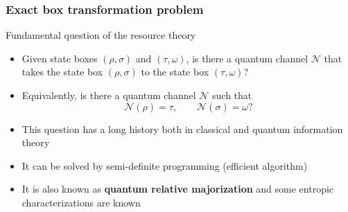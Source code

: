 \documentclass[usenames,dvipsnames,handout]{beamer}
\begin{document}
\begin{frame}

\frametitle{Exact box transformation problem}

\pause
\begin{block}{Fundamental question of the resource theory}

\begin{itemize}

\pause
\item Given state boxes $(\rho, \sigma)$ and  $(\tau, \omega)$, is there a quantum channel $\mathcal{N}$ that takes the state box $(\rho, \sigma)$ to the state box $(\tau, \omega)$?

\pause
\vspace{.1in}
\item Equivalently, is there a quantum channel $\mathcal{N}$ such that 
$$
\mathcal{N}(\rho) = \tau, \qquad \mathcal{N}(\sigma) = \omega   ?
$$
\end{itemize}

\end{block}

\begin{itemize}

\pause
\item This question has a long history both in classical and quantum information theory \cite{B53,AU80,CJW04,MOA11,Buscemi2012,HJRW12,BDS14,BHNOW15,Ren16,BD16,Buscemi2016,GJBDM18,B17,BG17}

\pause
\vspace{.1in}
\item It can be solved by semi-definite programming (efficient algorithm)

\pause
\vspace{.1in}
\item It is also known as {\color{MidnightBlue}\textbf{quantum relative majorization}} \cite{BG17} and some  entropic  characterizations are known

\end{itemize}

\end{frame}
\end{document}
